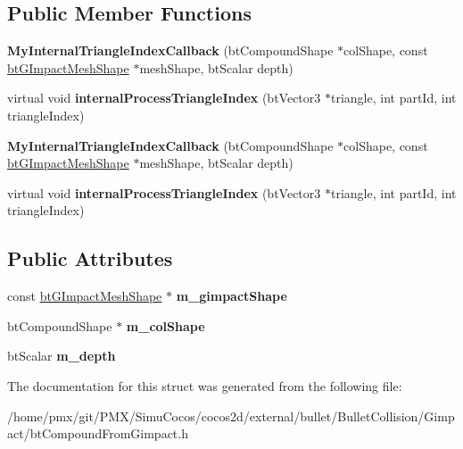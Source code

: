 \subsection*{Public Member Functions}
\begin{DoxyCompactItemize}
\item 
\mbox{\label{structMyInternalTriangleIndexCallback_a3b78054be7d170dbd42341627f603602}} 
{\bfseries My\+Internal\+Triangle\+Index\+Callback} (bt\+Compound\+Shape $\ast$col\+Shape, const \hyperlink{classbtGImpactMeshShape}{bt\+G\+Impact\+Mesh\+Shape} $\ast$mesh\+Shape, bt\+Scalar depth)
\item 
\mbox{\label{structMyInternalTriangleIndexCallback_a744a56475bf2d5132d1f733c1f3a70e5}} 
virtual void {\bfseries internal\+Process\+Triangle\+Index} (bt\+Vector3 $\ast$triangle, int part\+Id, int triangle\+Index)
\item 
\mbox{\label{structMyInternalTriangleIndexCallback_a3b78054be7d170dbd42341627f603602}} 
{\bfseries My\+Internal\+Triangle\+Index\+Callback} (bt\+Compound\+Shape $\ast$col\+Shape, const \hyperlink{classbtGImpactMeshShape}{bt\+G\+Impact\+Mesh\+Shape} $\ast$mesh\+Shape, bt\+Scalar depth)
\item 
\mbox{\label{structMyInternalTriangleIndexCallback_a744a56475bf2d5132d1f733c1f3a70e5}} 
virtual void {\bfseries internal\+Process\+Triangle\+Index} (bt\+Vector3 $\ast$triangle, int part\+Id, int triangle\+Index)
\end{DoxyCompactItemize}
\subsection*{Public Attributes}
\begin{DoxyCompactItemize}
\item 
\mbox{\label{structMyInternalTriangleIndexCallback_a851dc5d827a2287d956bb77155b43fce}} 
const \hyperlink{classbtGImpactMeshShape}{bt\+G\+Impact\+Mesh\+Shape} $\ast$ {\bfseries m\+\_\+gimpact\+Shape}
\item 
\mbox{\label{structMyInternalTriangleIndexCallback_a9bc3afe931fe22376aed2c1f931e8540}} 
bt\+Compound\+Shape $\ast$ {\bfseries m\+\_\+col\+Shape}
\item 
\mbox{\label{structMyInternalTriangleIndexCallback_a136aed7091600743b9442e759485ae45}} 
bt\+Scalar {\bfseries m\+\_\+depth}
\end{DoxyCompactItemize}


The documentation for this struct was generated from the following file\+:\begin{DoxyCompactItemize}
\item 
/home/pmx/git/\+P\+M\+X/\+Simu\+Cocos/cocos2d/external/bullet/\+Bullet\+Collision/\+Gimpact/bt\+Compound\+From\+Gimpact.\+h\end{DoxyCompactItemize}
